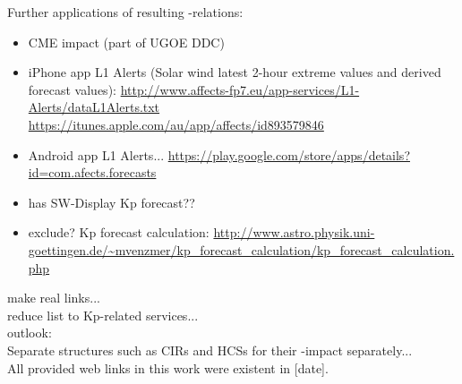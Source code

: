 Further applications of resulting \Kp{}-relations:
\begin{itemize}
	\item CME \Kp{} impact (part of UGOE DDC)
	\item iPhone app L1 Alerts (Solar wind latest 2-hour extreme values and derived forecast values): \url{http://www.affects-fp7.eu/app-services/L1-Alerts/dataL1Alerts.txt} \url{https://itunes.apple.com/au/app/affects/id893579846}
	\item Android app L1 Alerts... \url{https://play.google.com/store/apps/details?id=com.afects.forecasts}
	\item has SW-Display Kp forecast??
	\item exclude? Kp forecast calculation: \url{http://www.astro.physik.uni-goettingen.de/~mvenzmer/kp_forecast_calculation/kp_forecast_calculation.php}
\end{itemize}

make real links...\\

reduce list to Kp-related services...\\

outlook:\\
Separate structures such as CIRs and HCSs for their \Kp-impact separately...\\

All provided web links in this work were existent in [date].\\
